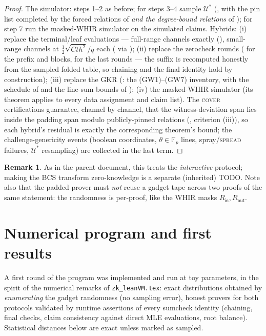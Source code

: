 \documentclass{article}
\newcommand{\Fp}{\mathbb{F}_p}
\theoremstyle{definition}
\newtheorem{remark}[theorem]{Remark}
\begin{document}
\begin{proof}
The simulator: steps 1--2 as before; for steps 3--4 sample $\mathcal{U}^*$ (, with the pin list completed by the forced relations of  \emph{and the degree-bound relations} of ); for step 7 run the masked-WHIR simulator on the simulated claims. Hybrids: (i) replace the terminal/leaf evaluations --- full-range channels exactly (), small-range channels at $\tfrac12\sqrt{Cth^2}/q$ each ( via ); (ii) replace the zerocheck rounds ( for the prefix and blocks,  for the last rounds --- the suffix is recomputed honestly from the sampled folded table, so chaining and the final identity hold by construction); (iii) replace the GKR (: the (GW1)--(GW7) inventory, with the schedule of  and the line-sum bounds of ); (iv) the masked-WHIR simulator (its theorem applies to every data assignment and claim list). The \textsc{cover} certifications guarantee, channel by channel, that the witness-deviation span lies inside the padding span modulo publicly-pinned relations (, criterion (iii)), so each hybrid's residual is exactly the corresponding theorem's bound; the challenge-genericity events (boolean coordinates, $\theta \in \Fp$ lines, spray/\textsc{spread} failures, $\mathcal{U}^*$ resampling) are collected in the last term.
\end{proof}

\begin{remark}
As in the parent document, this treats the \emph{interactive} protocol; making the BCS transform zero-knowledge is a separate (inherited) TODO. Note also that the padded prover must \emph{not} reuse a gadget tape across two proofs of the same statement: the randomness is per-proof, like the WHIR masks $R_{\mathsf{in}}, R_{\mathsf{out}}$.
\end{remark}

\section{Numerical program and first results}\label{sec:numerics}

A first round of the program was implemented and run at toy parameters, in the spirit of the numerical remarks of \texttt{zk\_leanVM.tex}: exact distributions obtained by \emph{enumerating} the gadget randomness (no sampling error), honest provers for both protocols validated by runtime assertions of every sumcheck identity (chaining, final checks, claim consistency against direct MLE evaluations, root balance). Statistical distances below are exact unless marked as sampled.
\end{document}
